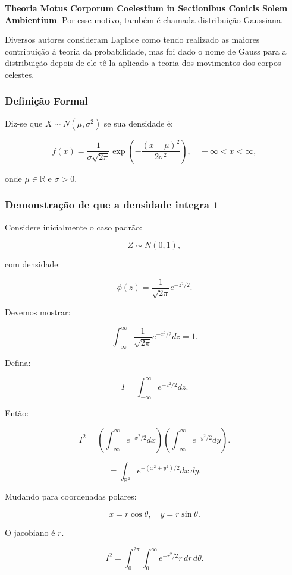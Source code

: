         \textbf{Theoria Motus Corporum Coelestium in Sectionibus Conicis Solem Ambientium}. Por esse motivo, também é chamada distribuição Gaussiana. \vskip0.3cm

Diversos autores consideram Laplace como tendo realizado as maiores contribuição à teoria da probabilidade, mas foi dado o nome de Gauss para a distribuição depois de ele tê-la aplicado a teoria dos movimentos dos corpos celestes.


\newpage
\subsubsection{Definição Formal}

Diz-se que $X \sim N(\mu,\sigma^2)$ se sua densidade é:

\[
f(x)
=
\frac{1}{\sigma\sqrt{2\pi}}
\exp\left(
-\frac{(x-\mu)^2}{2\sigma^2}
\right),
\quad -\infty < x < \infty,
\]

onde $\mu \in \mathbb{R}$ e $\sigma>0$.

\subsubsection{Demonstração de que a densidade integra 1}

Considere inicialmente o caso padrão:

\[
Z \sim N(0,1),
\]

com densidade:

\[
\phi(z)
=
\frac{1}{\sqrt{2\pi}}
e^{-z^2/2}.
\]

Devemos mostrar:

\[
\int_{-\infty}^{\infty}
\frac{1}{\sqrt{2\pi}}
e^{-z^2/2}
dz
=
1.
\]

Defina:

\[
I
=
\int_{-\infty}^{\infty}
e^{-z^2/2}
dz.
\]

Então:

\[
I^2
=
\left(
\int_{-\infty}^{\infty}
e^{-x^2/2}
dx
\right)
\left(
\int_{-\infty}^{\infty}
e^{-y^2/2}
dy
\right).
\]

\[
=
\int_{\mathbb{R}^2}
e^{-(x^2+y^2)/2}
dx\,dy.
\]

Mudando para coordenadas polares:

\[
x=r\cos\theta,
\quad
y=r\sin\theta.
\]

O jacobiano é $r$.

\[
I^2
=
\int_{0}^{2\pi}
\int_{0}^{\infty}
e^{-r^2/2}
r\,dr\,d\theta.
\]

